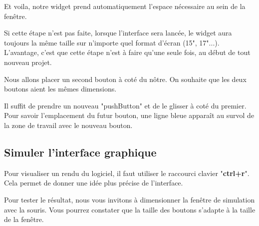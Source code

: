 {Et voila, notre widget prend automatiquement l'espace nécessaire au sein de la fenêtre. \newline





Si cette étape n'est pas faite, lorsque l'interface sera lancée, le widget aura toujours la même taille sur n'importe quel format d'écran (15", 17"...). L'avantage, c'est que cette étape n'est à faire qu'une seule fois, au début de tout nouveau projet. \newline

Nous allons placer un second bouton à coté du nôtre. On souhaite que les deux boutons aient les mêmes dimensions.

Il suffit de prendre un nouveau "pushButton" et de le glisser à coté du premier. Pour savoir l'emplacement du futur bouton, une ligne bleue apparaît au survol de la zone de travail avec le nouveau bouton.




{\color{red}}

\subsection{Simuler l'interface graphique}

Pour visualiser un rendu du logiciel, il faut utiliser le raccourci clavier "\textbf{ctrl+r}". \newline Cela permet de donner une idée plus précise de l'interface.




Pour tester le résultat, nous vous invitons à dimensionner la fenêtre de simulation avec la souris. Vous pourrez constater que la taille des boutons s'adapte à la taille de la fenêtre.

}
